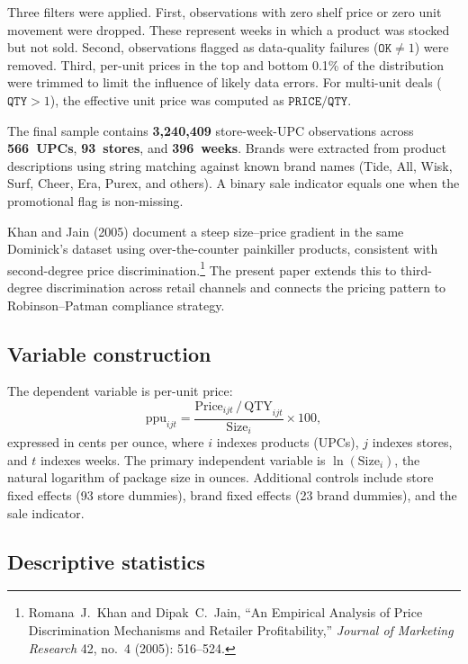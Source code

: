 \documentclass[12pt]{article}
\theoremstyle{definition}
\begin{document}
Three filters were applied.
First, observations with zero shelf price or zero unit movement were dropped. These represent weeks in which a product was stocked but not sold.
Second, observations flagged as data-quality failures ($\texttt{OK} \ne 1$) were removed.
Third, per-unit prices in the top and bottom 0.1\% of the distribution were trimmed to limit the influence of likely data errors.
For multi-unit deals ($\texttt{QTY} > 1$), the effective unit price was computed as $\texttt{PRICE}/\texttt{QTY}$.

The final sample contains \textbf{3,240,409} store-week-UPC observations across \textbf{566~UPCs}, \textbf{93~stores}, and \textbf{396~weeks}.
Brands were extracted from product descriptions using string matching against known brand names (Tide, All, Wisk, Surf, Cheer, Era, Purex, and others).
A binary sale indicator equals one when the promotional flag is non-missing.

Khan and Jain (2005) document a steep size--price gradient in the same Dominick's dataset using over-the-counter painkiller products, consistent with second-degree price discrimination.\footnote{Romana~J.\ Khan and Dipak~C.\ Jain, ``An Empirical Analysis of Price Discrimination Mechanisms and Retailer Profitability,'' \textit{Journal of Marketing Research} 42, no.~4 (2005): 516--524.} The present paper extends this to third-degree discrimination across retail channels and connects the pricing pattern to Robinson--Patman compliance strategy.

\subsection{Variable construction}

The dependent variable is per-unit price:
\begin{equation}\label{eq:ppu}
\text{ppu}_{ijt} = \frac{\text{Price}_{ijt}\,/\,\text{QTY}_{ijt}}{\text{Size}_i} \times 100,
\end{equation}
expressed in cents per ounce, where $i$ indexes products (UPCs), $j$ indexes stores, and $t$ indexes weeks.
The primary independent variable is $\ln(\text{Size}_i)$, the natural logarithm of package size in ounces.
Additional controls include store fixed effects (93 store dummies), brand fixed effects (23 brand dummies), and the sale indicator.

\subsection{Descriptive statistics}
\end{document}
